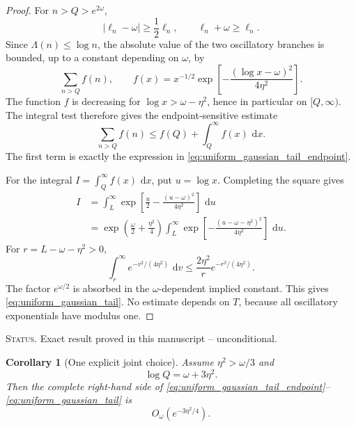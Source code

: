 \documentclass[11pt]{amsart}
\numberwithin{equation}{section}
\theoremstyle{plain}
\newtheorem{corollary}[theorem]{Corollary}
\theoremstyle{definition}
\theoremstyle{remark}
\newcommand{\1}{\mathbf{1}}
\newcommand{\dd}{\,\mathrm{d}}
\newcommand{\statusnote}[1]{%
  \par\smallskip\noindent
  \begingroup\footnotesize\textsc{Status.} #1\endgroup
  \par\smallskip}
\begin{document}
\begin{proof}
For \(n>Q>e^{2\omega}\),
\begin{equation}
|\ell_n-\omega|\geq\frac12\ell_n,
\qquad
\ell_n+\omega\geq\ell_n.
\label{eq:tail_denominator_bounds_detailed}
\end{equation}
Since \(\Lambda(n)\leq\log n\), the absolute value of the two oscillatory
branches is bounded, up to a constant depending on \(\omega\), by
\begin{equation}
\sum_{n>Q}f(n),
\qquad
f(x)
=
x^{-1/2}
\exp\left[-\frac{(\log x-\omega)^2}{4\eta^2}\right].
\label{eq:tail_integer_sum_detailed}
\end{equation}
The function \(f\) is decreasing for
\(\log x>\omega-\eta^2\), hence in particular on \([Q,\infty)\).
The integral test therefore gives the endpoint-sensitive estimate
\begin{equation}
\sum_{n>Q}f(n)
\leq
f(Q)+\int_Q^\infty f(x)\,\dd x.
\label{eq:tail_sum_endpoint_integral}
\end{equation}
The first term is exactly the expression in
\eqref{eq:uniform_gaussian_tail_endpoint}.

For the integral \(I=\int_Q^\infty f(x)\,\dd x\), put \(u=\log x\).
Completing the square gives
\begin{align}
I
&=
\int_L^\infty
\exp\left[
\frac u2-
\frac{(u-\omega)^2}{4\eta^2}
\right]\,\dd u
\label{eq:tail_square_one}
\\
&=
\exp\left(\frac\omega2+\frac{\eta^2}{4}\right)
\int_L^\infty
\exp\left[-
\frac{(u-\omega-\eta^2)^2}{4\eta^2}
\right]\,\dd u.
\label{eq:tail_square_two}
\end{align}
For \(r=L-\omega-\eta^2>0\),
\begin{equation}
\int_r^\infty e^{-v^2/(4\eta^2)}\,\dd v
\leq
\frac{2\eta^2}{r}e^{-r^2/(4\eta^2)}.
\label{eq:gaussian_tail_elementary}
\end{equation}
The factor \(e^{\omega/2}\) is absorbed in the
\(\omega\)-dependent implied constant.  This gives
\eqref{eq:uniform_gaussian_tail}.  No estimate depends on \(T\), because
all oscillatory exponentials have modulus one.
\end{proof}

\statusnote{Exact result proved in this manuscript -- unconditional.}
\begin{corollary}[One explicit joint choice]
\label{cor:joint_Q_eta_choice}
Assume \(\eta^2>\omega/3\) and
\begin{equation}
\log Q=\omega+3\eta^2.
\label{eq:joint_Q_eta_choice}
\end{equation}
Then the complete right-hand side of
\eqref{eq:uniform_gaussian_tail_endpoint}--
\eqref{eq:uniform_gaussian_tail} is
\begin{equation}
O_\omega(e^{-3\eta^2/4}).
\label{eq:joint_Q_eta_decay}
\end{equation}
\end{corollary}
\end{document}

